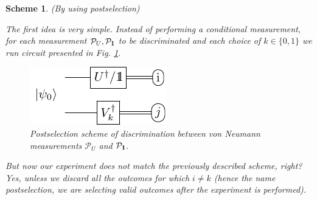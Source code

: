 \documentclass[preprint,12pt, a4paper, dvipsnames]{elsarticle}
\newcommand{\ket}[1]{\ensuremath{|#1\rangle}}
\newcommand{\bra}[1]{\ensuremath{\langle#1|}}
\newcommand{\ketbra}[2]{\ensuremath{\ket{#1}\bra{#2}}}
\newcommand{\proj}[1]{\ensuremath{\ketbra{#1}{#1}}}
\newcommand{\1}{{\rm 1\hspace{-0.9mm}l}}
\newcommand{\Id}{{\rm 1\hspace{-0.9mm}l}}
\newcommand{\PP}{\mathcal{P}}
\newtheorem{scheme}{Scheme}
\begin{document}
\begin{scheme}(By using postselection)

	The first idea is very simple. Instead of performing a conditional measurement, for each
	measurement $\PP_U, \PP_\Id$ to be discriminated and each choice of $k \in \{0, 1\}$ we run circuit presented in Fig. \ref{fig:postselection}.

	\begin{figure}[h!]
		\centering
		\includegraphics[scale=1.7]{pics/postselection_no_channels}

		\caption{
			Postselection scheme of discrimination between von Neumann measurements $\PP_{U}$ and $\PP_\Id$.
		}\label{fig:postselection}
	\end{figure}

	But now our experiment does not match the previously described scheme, right?
	Yes, unless we discard all the outcomes for which $i\ne k$ (hence the name \emph{postselection},
	we are selecting valid outcomes after the experiment is performed).





\end{scheme}
\end{document}

